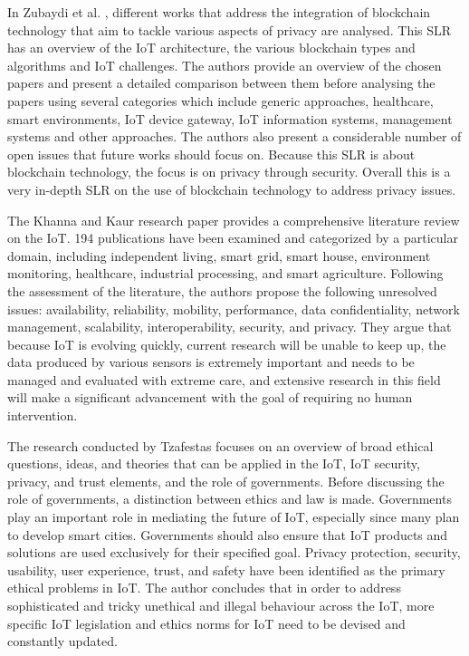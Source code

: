 In Zubaydi et al. \cite{zubaydi2023leveraging}, different works that address the
integration of blockchain technology that aim to tackle various aspects of privacy
are analysed. This SLR has an overview of the IoT architecture, the various blockchain
types and algorithms and IoT challenges. The authors provide an overview of the
chosen papers and present a detailed comparison between them before analysing
the papers using several categories which include generic approaches, healthcare,
smart environments, IoT device gateway, IoT information systems, management systems
and other approaches. The authors also present a considerable number of open issues
that future works should focus on. Because this SLR is about blockchain technology,
the focus is on privacy through security. Overall this is a very in-depth SLR on the
use of blockchain technology to address privacy issues.

The Khanna and Kaur \cite{khanna2020internet} research paper provides a comprehensive
literature review on the IoT. 194 publications have been examined and categorized
by a particular domain, including independent living, smart grid, smart house,
environment monitoring, healthcare, industrial processing, and smart agriculture.
Following the assessment of the literature, the authors propose the following
unresolved issues: availability, reliability, mobility, performance, data
confidentiality, network management, scalability, interoperability, security,
and privacy. They argue that because IoT is evolving quickly, current research
will be unable to keep up, the data produced by various sensors is extremely
important and needs to be managed and evaluated with extreme care, and extensive
research in this field will make a significant advancement with the goal of
requiring no human intervention.

The research conducted by Tzafestas \cite{tzafestas2018ethics} focuses on
an overview of broad ethical questions, ideas, and theories that can be
applied in the IoT, IoT security, privacy, and trust elements, and the role
of governments. Before discussing the role of governments, a distinction
between ethics and law is made. Governments play an important role in mediating
the future of IoT, especially since many plan to develop smart cities.
Governments should also ensure that IoT products and solutions are used
exclusively for their specified goal. Privacy protection, security, usability,
user experience, trust, and safety have been identified as the primary
ethical problems in IoT. The author concludes that in order to address
sophisticated and tricky unethical and illegal behaviour across the IoT,
more specific IoT legislation and ethics norms for IoT need to be devised
and constantly updated.


